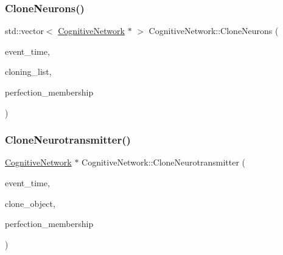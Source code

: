 \subsubsection{\texorpdfstring{Clone\+Neurons()}{CloneNeurons()}}
{\footnotesize\ttfamily std\+::vector$<$ \mbox{\hyperlink{classCognitiveNetwork}{Cognitive\+Network}} $\ast$ $>$ Cognitive\+Network\+::\+Clone\+Neurons (\begin{DoxyParamCaption}\item[{std\+::chrono\+::time\+\_\+point$<$ \mbox{\hyperlink{universe_8h_a0ef8d951d1ca5ab3cfaf7ab4c7a6fd80}{Clock}} $>$}]{event\+\_\+time,  }\item[{std\+::vector$<$ \mbox{\hyperlink{classCognitiveNetwork}{Cognitive\+Network}} $\ast$$>$}]{cloning\+\_\+list,  }\item[{double}]{perfection\+\_\+membership }\end{DoxyParamCaption})}

\mbox{\label{classCognitiveNetwork_af78d31471a121844e4735d809c900502}} 
\subsubsection{\texorpdfstring{Clone\+Neurotransmitter()}{CloneNeurotransmitter()}}
{\footnotesize\ttfamily \mbox{\hyperlink{classCognitiveNetwork}{Cognitive\+Network}} $\ast$ Cognitive\+Network\+::\+Clone\+Neurotransmitter (\begin{DoxyParamCaption}\item[{std\+::chrono\+::time\+\_\+point$<$ \mbox{\hyperlink{universe_8h_a0ef8d951d1ca5ab3cfaf7ab4c7a6fd80}{Clock}} $>$}]{event\+\_\+time,  }\item[{\mbox{\hyperlink{classCognitiveNetwork}{Cognitive\+Network}} $\ast$}]{clone\+\_\+object,  }\item[{double}]{perfection\+\_\+membership }\end{DoxyParamCaption})}

\mbox{\label{classCognitiveNetwork_a2b2d40d179f95ff96e9aa0559234cc31}} 
